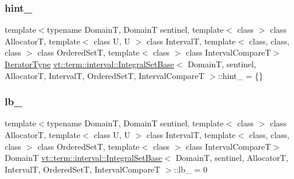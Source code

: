 \mbox{\label{structvt_1_1term_1_1interval_1_1_integral_set_base_a50bd3ba628483148568402f9b474f680}} 
\subsubsection{\texorpdfstring{hint\+\_\+}{hint\_}}
{\footnotesize\ttfamily template$<$typename DomainT, DomainT sentinel, template$<$ class $>$ class AllocatorT, template$<$ class U, U $>$ class IntervalT, template$<$ class, class, class $>$ class Ordered\+SetT, template$<$ class $>$ class Interval\+CompareT$>$ \\
\hyperlink{structvt_1_1term_1_1interval_1_1_integral_set_base_a111b2ec1ea960a40ba4270be702f11f1}{Iterator\+Type} \hyperlink{structvt_1_1term_1_1interval_1_1_integral_set_base}{vt\+::term\+::interval\+::\+Integral\+Set\+Base}$<$ DomainT, sentinel, AllocatorT, IntervalT, Ordered\+SetT, Interval\+CompareT $>$\+::hint\+\_\+ = \{\}\hspace{0.3cm}{\ttfamily [private]}}

\mbox{\label{structvt_1_1term_1_1interval_1_1_integral_set_base_a81a48c32a51a56d1006dc212b2de60aa}} 
\subsubsection{\texorpdfstring{lb\+\_\+}{lb\_}}
{\footnotesize\ttfamily template$<$typename DomainT, DomainT sentinel, template$<$ class $>$ class AllocatorT, template$<$ class U, U $>$ class IntervalT, template$<$ class, class, class $>$ class Ordered\+SetT, template$<$ class $>$ class Interval\+CompareT$>$ \\
DomainT \hyperlink{structvt_1_1term_1_1interval_1_1_integral_set_base}{vt\+::term\+::interval\+::\+Integral\+Set\+Base}$<$ DomainT, sentinel, AllocatorT, IntervalT, Ordered\+SetT, Interval\+CompareT $>$\+::lb\+\_\+ = 0\hspace{0.3cm}{\ttfamily [private]}}

